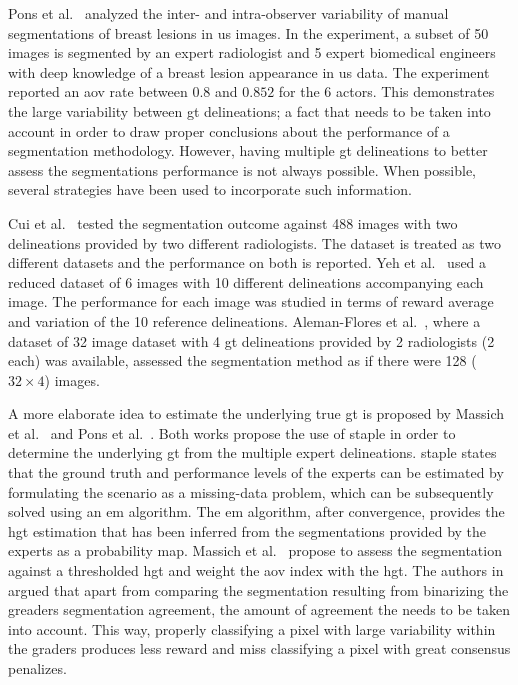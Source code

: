 Pons et al.~\cite{gerard2013} analyzed the inter- and intra-observer variability of manual segmentations of breast lesions in \ac{us} images. In the experiment, a subset of 50 images is segmented by an expert radiologist and 5 expert biomedical engineers with deep knowledge of a breast lesion appearance in \ac{us} data. The experiment reported an \ac{aov} rate between $0.8$ and $0.852$ for the 6 actors. This demonstrates the large variability between \ac{gt} delineations; a fact that needs to be taken into account in order to draw proper conclusions about the performance of a segmentation methodology. However, having multiple \ac{gt} delineations to better assess the segmentations performance is not always possible. When possible, several strategies have been used to incorporate such information.

Cui et al.~\cite{Cui:2009p14325} tested the segmentation outcome against 488 images with two delineations provided by two different radiologists. The dataset is treated as two different datasets and the performance on both is reported.
Yeh et al.~\cite{Yeh:2009p11985} used a reduced dataset of 6 images with 10 different delineations accompanying each image. The performance for each image was studied in terms of reward average and variation of the 10 reference delineations.
Aleman-Flores et al.~\cite{AlemanFlores:2007p14310}, where a dataset of 32 image dataset with 4 \ac{gt} delineations provided by 2 radiologists (2 each) was available, assessed the segmentation method as if there were 128 ($32 \times 4$) images.

A more elaborate idea to estimate the underlying true \ac{gt} is proposed by Massich et al.~\cite{massich2010lesion} and Pons et al.~\cite{gerard2013}. Both works propose the use of \ac{staple} in order to determine the underlying \ac{gt} from the multiple expert delineations. \ac{staple} states that the ground truth and performance levels of the experts can be estimated by formulating the scenario as a missing-data problem, which can be subsequently solved using an \ac{em} algorithm. The \ac{em} algorithm, after convergence, provides the \acf{hgt} estimation that has been inferred from the segmentations provided by the experts as a probability map. Massich et al.~\cite{massich2010lesion} propose to assess the segmentation against a thresholded \ac{hgt} and weight the \ac{aov} index with the \ac{hgt}. The authors in~\cite{massich2010lesion} argued that apart from comparing the segmentation resulting from binarizing the greaders segmentation agreement, the amount of agreement the needs to be taken into account. This way, properly classifying a pixel with large variability within the graders produces less reward and miss classifying a pixel with great consensus penalizes.

